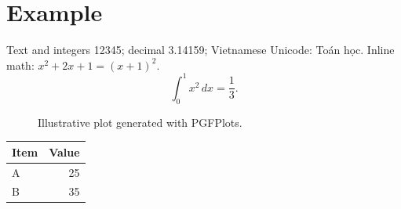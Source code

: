 \documentclass{article}
\begin{document}
\section{Example}
Text and integers 12345; decimal 3.14159; Vietnamese Unicode: Toán học.
Inline math: $x^2+2x+1=(x+1)^2$.
\begin{equation}
\int_0^1 x^2\,dx=\frac{1}{3}.
\end{equation}
\begin{figure}[ht]
\centering
{}
\caption{Illustrative plot generated with PGFPlots.}
\end{figure}
\begin{tabular}{|l|r|}
\hline Item & Value \\ \hline A & 25 \\ B & 35 \\ \hline
\end{tabular}
\end{document}
